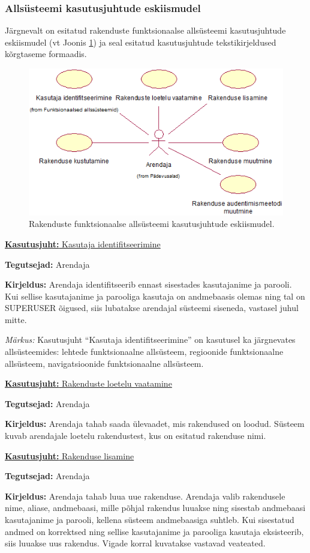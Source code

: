 \documentclass[a4paper,12pt]{article} %
\begin{document}
\subsubsection{Allsüsteemi kasutusjuhtude eskiismudel}
Järgnevalt on esitatud rakenduste funktsionaalse allsüsteemi kasutusjuhtude eskiismudel (vt Joonis \ref{fig_rakenduste_funktsionaalse_allsüsteemi_kasutusjuhtude_eskiismudel}) ja seal esitatud kasutusjuhtude tekstikirjeldused kõrgtaseme formaadis.
\begin{figure}[H]
\centering
\includegraphics[width=\textwidth]{./diagrams/applications-subsystem-use-case-digram.png}
\caption{Rakenduste funktsionaalse allsüsteemi kasutusjuhtude eskiismudel.}
\label{fig_rakenduste_funktsionaalse_allsüsteemi_kasutusjuhtude_eskiismudel}
\end{figure}
\underline{\textbf{Kasutusjuht:} Kasutaja identifitseerimine}
\par
\textbf{Tegutsejad:} Arendaja
\par
\textbf{Kirjeldus:} Arendaja identifitseerib ennast sisestades kasutajanime ja parooli. Kui sellise kasutajanime ja parooliga kasutaja on andmebaasis olemas ning tal on SUPERUSER õigused, siis lubatakse arendajal süsteemi siseneda, vastasel juhul mitte.
\par
\textit{Märkus:} Kasutusjuht  ``Kasutaja identifitseerimine'' on kasutusel ka järgnevates allsüsteemides: lehtede funktsionaalne allsüsteem, regioonide funktsionaalne allsüsteem, navigatsioonide funktsionaalne allsüsteem.\par

\underline{\textbf{Kasutusjuht:} Rakenduste loetelu vaatamine}
\par
\textbf{Tegutsejad:} Arendaja
\par
\textbf{Kirjeldus:} Arendaja tahab saada ülevaadet, mis rakendused on loodud. Süsteem kuvab arendajale loetelu rakendustest, kus on esitatud rakenduse nimi.
\par
\pagebreak
\underline{\textbf{Kasutusjuht:} Rakenduse lisamine}
\par
\textbf{Tegutsejad:} Arendaja
\par
\textbf{Kirjeldus:} Arendaja tahab luua uue rakenduse. Arendaja valib rakendusele nime, aliase, andmebaasi, mille põhjal rakendus luuakse ning sisestab andmebaasi kasutajanime ja parooli, kellena süsteem andmebaasiga suhtleb. Kui sisestatud andmed on korrektsed ning sellise kasutajanime ja parooliga kasutaja eksisteerib, siis luuakse uus rakendus. Vigade korral kuvatakse vastavad veateated.
\par
\end{document}
